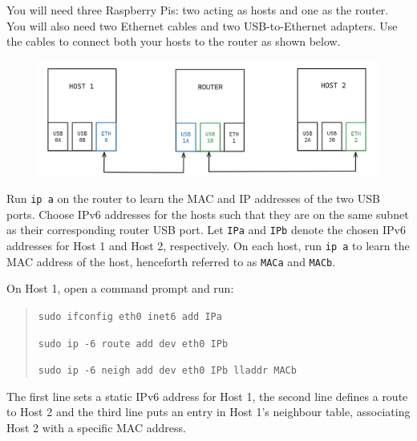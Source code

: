 



You will need three Raspberry Pis: two acting as hosts and one as the router. You will also need two Ethernet cables and two USB-to-Ethernet adapters. Use the cables to connect both your hosts to the router as shown below.

\begin{figure}[htbp]
  \centering
    \includegraphics[width=1\textwidth]{figures/appendices/ipv6_setup.jpg}
\end{figure}

Run \texttt{ip a} on the router to learn the MAC and IP addresses of the two USB ports. Choose IPv6 addresses for the hosts such that they are on the same subnet as their corresponding router USB port. Let \texttt{IPa} and \texttt{IPb} denote the chosen IPv6 addresses for Host 1 and Host 2, respectively. On each host, run \texttt{ip a} to learn the MAC address of the host, henceforth referred to as \texttt{MACa} and \texttt{MACb}.

On Host 1, open a command prompt and run:
\begin{quote}
    \texttt{sudo ifconfig eth0 inet6 add IPa}
    
    \texttt{sudo ip -6 route add dev eth0 IPb}
    
    \texttt{sudo ip -6 neigh add dev eth0 IPb lladdr MACb}
\end{quote}

The first line sets a static IPv6 address for Host 1, the second line defines a route to Host 2 and the third line puts an entry in Host 1’s neighbour table, associating Host 2 with a specific MAC address.

